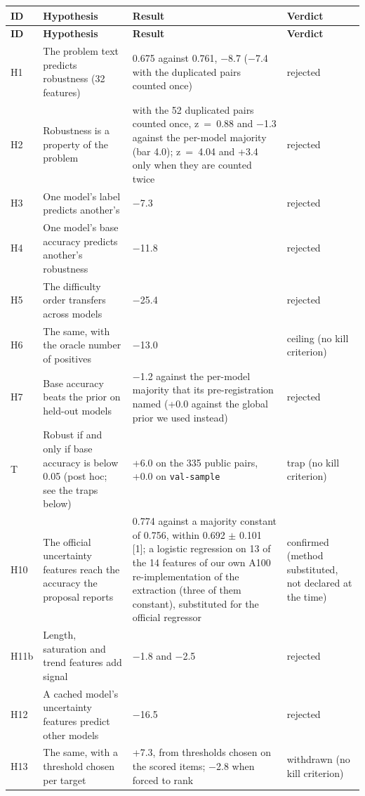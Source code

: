 {\small\setlength{\tabcolsep}{4pt}\renewcommand{\arraystretch}{1.2}
\begin{longtable}{L{1.1cm}L{3.9cm}L{5.6cm}L{2.0cm}}
\toprule
\textbf{ID} & \textbf{Hypothesis} & \textbf{Result} & \textbf{Verdict} \\
\midrule
\endfirsthead
\toprule
\textbf{ID} & \textbf{Hypothesis} & \textbf{Result} & \textbf{Verdict} \\
\midrule
\endhead
\bottomrule
\endlastfoot
H1 & The problem text predicts robustness (32 features) & 0.675 against 0.761, $-$8.7 ($-$7.4 with the duplicated pairs counted once) & rejected \\
H2 & Robustness is a property of the problem & with the 52 duplicated pairs counted once, z~=~0.88 and $-$1.3 against the per-model majority (bar 4.0); z~=~4.04 and +3.4 only when they are counted twice & rejected \\
H3 & One model's label predicts another's & $-$7.3 & rejected \\
H4 & One model's base accuracy predicts another's robustness & $-$11.8 & rejected \\
H5 & The difficulty order transfers across models & $-$25.4 & rejected \\
H6 & The same, with the oracle number of positives & $-$13.0 & ceiling (no kill criterion) \\
H7 & Base accuracy beats the prior on held-out models & $-$1.2 against the per-model majority that its pre-registration named (+0.0 against the global prior we used instead) & rejected \\
T & Robust if and only if base accuracy is below 0.05 (post hoc; see the traps below) & +6.0 on the 335 public pairs, +0.0 on \texttt{val-sample} & trap (no kill criterion) \\
H10 & The official uncertainty features reach the accuracy the proposal reports & 0.774 against a majority constant of 0.756, within 0.692 $\pm$ 0.101 [1]; a logistic regression on 13 of the 14 features of our own A100 re-implementation of the extraction (three of them constant), substituted for the official regressor & confirmed (method substituted, not declared at the time) \\
H11b & Length, saturation and trend features add signal & $-$1.8 and $-$2.5 & rejected \\
H12 & A cached model's uncertainty features predict other models & $-$16.5 & rejected \\
H13 & The same, with a threshold chosen per target & +7.3, from thresholds chosen on the scored items; $-$2.8 when forced to rank & withdrawn (no kill criterion) \\

\end{longtable}}
